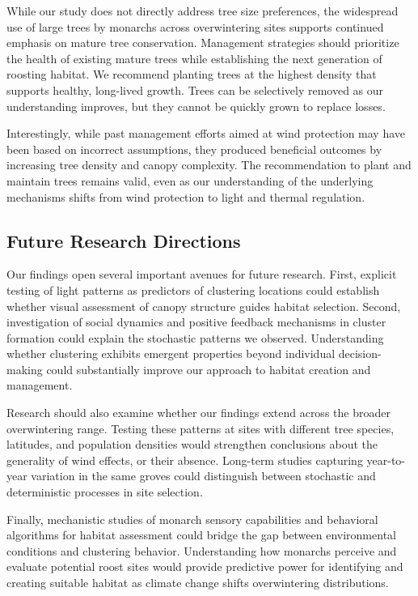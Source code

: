 While our study does not directly address tree size preferences, the widespread use of large trees by monarchs across overwintering sites supports continued emphasis on mature tree conservation. Management strategies should prioritize the health of existing mature trees while establishing the next generation of roosting habitat. We recommend planting trees at the highest density that supports healthy, long-lived growth. Trees can be selectively removed as our understanding improves, but they cannot be quickly grown to replace losses.

Interestingly, while past management efforts aimed at wind protection may have been based on incorrect assumptions, they produced beneficial outcomes by increasing tree density and canopy complexity. The recommendation to plant and maintain trees remains valid, even as our understanding of the underlying mechanisms shifts from wind protection to light and thermal regulation.

\subsection{Future Research Directions}

Our findings open several important avenues for future research. First, explicit testing of light patterns as predictors of clustering locations could establish whether visual assessment of canopy structure guides habitat selection. Second, investigation of social dynamics and positive feedback mechanisms in cluster formation could explain the stochastic patterns we observed. Understanding whether clustering exhibits emergent properties beyond individual decision-making could substantially improve our approach to habitat creation and management.

Research should also examine whether our findings extend across the broader overwintering range. Testing these patterns at sites with different tree species, latitudes, and population densities would strengthen conclusions about the generality of wind effects, or their absence. Long-term studies capturing year-to-year variation in the same groves could distinguish between stochastic and deterministic processes in site selection.

Finally, mechanistic studies of monarch sensory capabilities and behavioral algorithms for habitat assessment could bridge the gap between environmental conditions and clustering behavior. Understanding how monarchs perceive and evaluate potential roost sites would provide predictive power for identifying and creating suitable habitat as climate change shifts overwintering distributions.

